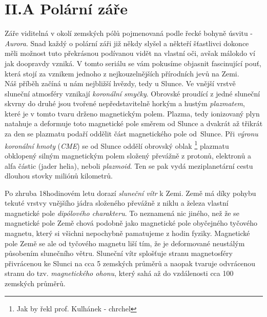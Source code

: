 \documentclass{../../../../style/mkimain}
\begin{document}
\section*{II.A Polární záře}
Záře viditelná v okolí zemských pólů pojmenovaná podle řecké bohyně úsvitu - \emph{Aurora}. 
Snad každý o polární záři již někdy slyšel a někteří šťastlivci dokonce měli možnost 
tuto překrásnou podívanou vidět na vlastní oči, avšak málokdo ví jak doopravdy vzniká. 
V tomto seriálu se vám pokusíme objasnit fascinující pouť, která stojí za vznikem jednoho
 z nejkouzelnějších přírodních jevů na Zemi.  
\\

Náš příběh začíná u nám nejbližší hvězdy, tedy u Slunce. Ve vnější vrstvě sluneční atmosféry 
vznikají \emph{koronální smyčky}. Obrovské  proudící z jedné sluneční skvrny do 
druhé jsou tvořené nepředstavitelně horkým a hustým \emph{plazmatem}, které je v tomto tvaru drženo magnetickým polem.
Plazma, tedy ionizovaný plyn natahuje a deformuje toto magnetické pole směrem od Slunce a 
dvakrát až třikrát za den se plazmatu podaří oddělit část magnetického pole od~Slunce. 
Při \emph{výronu koronální hmoty} (\emph{CME}) se od Slunce oddělí obrovský oblak \footnote[1]{Jak by řekl prof. Kulhánek - chrchel} plazmatu obklopený silným 
magnetickým polem složený převážně z protonů, elektronů a alfa částic (jader helia), neboli \emph{plazmoid}.
Ten se pak vydá meziplanetární cestu dlouhou stovky miliónů kilometrů. 

Po zhruba 18hodinovém letu dorazí \emph{sluneční vítr} k Zemi. Země má díky pohybu tekuté vrstvy 
vnějšího jádra složeného převážně z niklu a železa vlastní magnetické pole \emph{dipólového charakteru}.
To neznamená nic jiného, než že se magnetické pole Země chová podobně jako magnetické pole 
obyčejného tyčového magnetu, který si všichni nepochybně pamatujeme z hodin fyziky. Magnetické pole Země
se ale od tyčového magnetu liší tím, že je deformované neustálým působením slunečního větru. Sluneční 
vítr splošťuje stranu magnetosféry přivrácenou ke Slunci na cca 5 zemských průměrů a naopak 
tvaruje odvrácenou stranu do tzv. \emph{magnetického ohonu}, který sahá až do vzdálenosti cca 
100 zemských průměrů.
\end{document}
